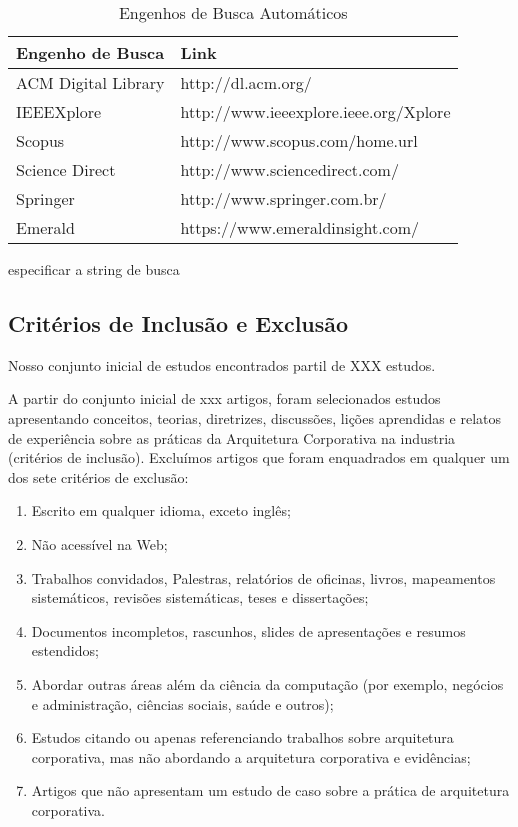 \begin{table}[H] 
    \label{tab:engenhosBusca}
    \centering
    \caption{Engenhos de Busca Automáticos}
    \begin{tabular}{@{}ll@{}}
        \toprule
        Engenho de Busca    & Link                                  \\ \midrule
        ACM Digital Library & http://dl.acm.org/                    \\
        IEEEXplore          & http://www.ieeexplore.ieee.org/Xplore \\
        Scopus              & http://www.scopus.com/home.url        \\
        Science Direct      & http://www.sciencedirect.com/         \\
        Springer            & http://www.springer.com.br/           \\
        Emerald             & https://www.emeraldinsight.com/       \\ \bottomrule
    \end{tabular}
\end{table}

especificar a string de busca

\subsection{Critérios de Inclusão e Exclusão}

Nosso conjunto inicial de estudos encontrados partil de XXX estudos. 

A partir do conjunto inicial de xxx artigos, foram selecionados estudos apresentando conceitos, teorias, diretrizes, discussões, lições aprendidas e relatos de experiência sobre as práticas da Arquitetura Corporativa na industria (critérios de inclusão). Excluímos artigos que foram enquadrados em qualquer um dos sete critérios de exclusão:

\begin{enumerate}
    \item Escrito em qualquer idioma, exceto inglês;
    \item Não acessível na Web;
    \item Trabalhos convidados, Palestras, relatórios de oficinas, livros, mapeamentos sistemáticos, revisões sistemáticas, teses e dissertações;
    \item Documentos incompletos, rascunhos, slides de apresentações e resumos estendidos; 
    \item Abordar outras áreas além da ciência da computação (por exemplo, negócios e administração, ciências sociais, saúde e outros);
    \item Estudos citando ou apenas referenciando trabalhos sobre arquitetura corporativa, mas não abordando a arquitetura corporativa e evidências;
    \item Artigos que não apresentam um estudo de caso sobre a prática de arquitetura corporativa.
\end{enumerate}

